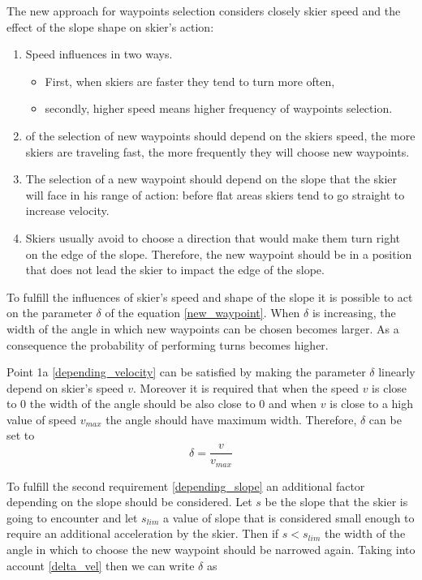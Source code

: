 \documentclass[12pt,a4paper,twoside]{book}
\begin{document}
The new approach for waypoints selection considers closely skier speed and the effect of the slope shape on skier's action:\begin{enumerate}
\item \label{depending_velocity} Speed influences in two ways. 
\begin{itemize}
\item First, when skiers are faster they tend to turn more often, 
\item secondly, higher speed means higher frequency of waypoints selection.  
\end{itemize}
\item \label{frequency} of the selection of new waypoints should depend on the skiers speed, the more skiers are traveling fast, the more frequently they will choose new waypoints.
\item \label{depending_slope} The selection of a new waypoint should depend on the slope that the skier will face in his range of action: before flat areas skiers tend to go straight to increase velocity.

\item \label{avoid_impact} Skiers usually avoid to choose a direction that would make them turn right on the edge of the slope. Therefore, the new waypoint should be in a position that does not lead the skier to impact the edge of the slope.
\end{enumerate}

To fulfill the influences of skier's speed and shape of the slope it is possible to act on the parameter $\delta$ of the equation \ref{new_waypoint}. When $\delta$ is increasing, the width of the angle in which new waypoints can be chosen becomes larger. As a consequence the probability of performing turns becomes higher.

Point 1a \ref{depending_velocity} can be satisfied by making the parameter $\delta$ linearly depend on skier's speed $v$. Moreover it is required that when the speed $v$ is close to $0$ the width of the angle should be also close to $0$ and when $v$ is close to a high value of speed $v_{max}$ the angle should have maximum width. Therefore, $\delta$ can be set to
\begin{equation}\label{delta_vel}
\delta= \frac{v}{v_{max}}
\end{equation}

To fulfill the second requirement \ref{depending_slope} an additional factor depending on the slope should be considered. Let $s$ be the slope that the skier is going to encounter and let $s_{lim}$ a value of slope that is considered small enough to require an additional acceleration by the skier. Then if $s<s_{lim}$ the width of the angle in which to choose the new waypoint should be narrowed again. Taking into account \ref{delta_vel} then we can write $\delta$ as
\end{document}
